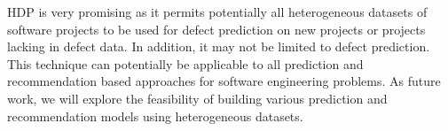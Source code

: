 
HDP is very promising as it permits potentially all heterogeneous datasets
of software projects to be used for defect prediction on new projects or
projects lacking in defect data.
In addition, it may not be limited to defect prediction. This technique can
potentially be applicable to all prediction and recommendation based approaches
for software engineering problems.
As future work, we will explore the feasibility of building various prediction
and recommendation models using heterogeneous datasets.





